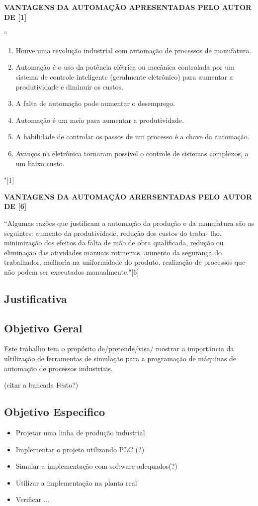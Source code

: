 \documentclass[a4paper, 12pt]{article}
\begin{document}
\textbf{VANTAGENS DA AUTOMAÇÃO APRESENTADAS PELO AUTOR DE [1]}

``
\begin{enumerate}
	\item Houve uma revolução industrial com automação de processos de manufatura.
	\item Automação é o uso da potência elétrica ou mecânica controlada por um
				sistema de controle inteligente (geralmente eletrônico) para aumentar
				a produtividade e diminuir os custos.
	\item A falta de automação pode aumentar o desemprego.
	\item Automação é um meio para aumentar a produtividade.
	\item A habilidade de controlar os passos de um processo é a chave da automação.
	\item Avanços na eletrônica tornaram possível o controle de sistemas complexos,
				a um baixo custo.
\end{enumerate} 
"[1]

\textbf{VANTAGENS DA AUTOMAÇÃO ARERSENTADAS PELO AUTOR DE [6]}

``Algumas razões que justificam a automação da produção e da manufatura
são as seguintes: aumento da produtividade, redução dos custos do traba-
lho, minimização dos efeitos da falta de mão de obra qualificada, redução
ou eliminação das atividades manuais rotineiras, aumento da segurança do
trabalhador, melhoria na uniformidade do produto, realização de processos
que não podem ser executados manualmente."[6]

\subsection{Justificativa}
\subsection{Objetivo Geral}

Este trabalho tem o propósito de/pretende/visa/ mostrar a importância da 
ultilização de ferramentas de simulação para a programação de máquinas de
automação de processos industriais.

(citar a bancada Festo?)

\subsection{Objetivo Especifico}

\begin{itemize}
  \item Projetar uma linha de produção industrial
  \item Implementar o projeto utilizando PLC (?)
  \item Simular a implementação com software adequados(?)
  \item Utilizar a implementação na planta real
  \item Verificar ...
\end{itemize}
\end{document}
